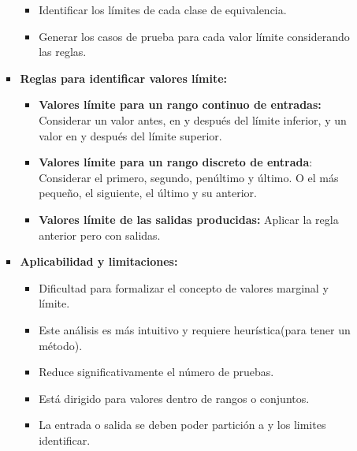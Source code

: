 \documentclass[12pt, twoside, openright]{report} %
\begin{document}
\begin{itemize}
\begin{itemize}
\begin{itemize}
\begin{itemize}
      \item Identificar los límites de cada clase de equivalencia.
        
      \item Generar los casos de prueba para cada valor límite considerando
        las reglas.
        
      \end{itemize}
	  \pagebreak
    \item \textbf{Reglas para identificar valores límite:}
      

      \begin{itemize}
      \item \textbf{Valores límite para un rango continuo de entradas:}
        Considerar un valor antes, en y después del límite inferior, y
        un valor en y después del límite superior.
        
      \item \textbf{Valores límite para un rango discreto de entrada}:
        Considerar el primero, segundo, penúltimo y último. O el más
        pequeño, el siguiente, el último y su anterior.
        
      \item \textbf{Valores límite de las salidas producidas:} Aplicar la
        regla anterior pero con salidas.
        
      \end{itemize}
    \item \textbf{Aplicabilidad y limitaciones:}
      

      \begin{itemize}
      \item Dificultad para formalizar el concepto de valores marginal y
        límite.
        
      \item Este análisis es más intuitivo y requiere heurística(para tener
        un método).
        
      \item Reduce significativamente el número de pruebas.
        
      \item Está dirigido para valores dentro de rangos o conjuntos.
        
      \item La entrada o salida se deben poder partición a y los limites
        identificar.
        
      \end{itemize}
    \end{itemize}
  \end{itemize}
\end{itemize}
\end{document}

